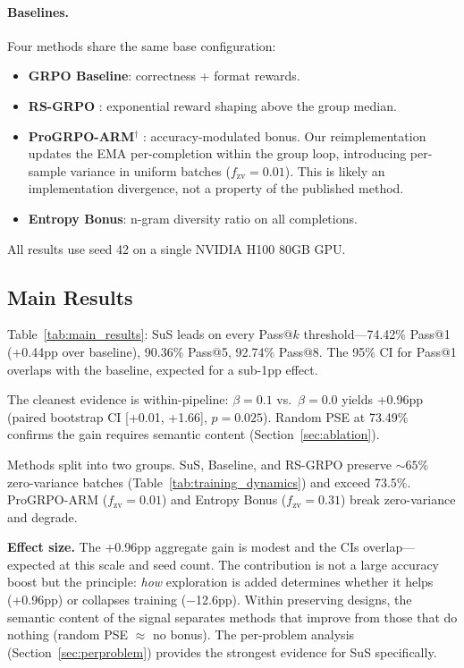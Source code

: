 \documentclass[10pt]{article}
\begin{document}
\paragraph{Baselines.}
Four methods share the same base configuration:
\begin{itemize}[leftmargin=*,noitemsep,topsep=2pt]
    \item \textbf{GRPO Baseline}: correctness + format rewards.
    \item \textbf{RS-GRPO} \citep{yu2025rsgrpo}: exponential reward shaping above the group median.
    \item \textbf{ProGRPO-ARM$^\dagger$} \citep{cui2025progrpo}: accuracy-modulated bonus. Our reimplementation updates the EMA per-completion within the group loop, introducing per-sample variance in uniform batches ($f_{\text{zv}} = 0.01$). This is likely an implementation divergence, not a property of the published method.
    \item \textbf{Entropy Bonus}: n-gram diversity ratio on all completions.
\end{itemize}

All results use seed 42 on a single NVIDIA H100 80GB GPU.

\subsection{Main Results}
\label{sec:main_results}



Table~\ref{tab:main_results}: SuS leads on every Pass@$k$ threshold---74.42\% Pass@1 (+0.44pp over baseline), 90.36\% Pass@5, 92.74\% Pass@8. The 95\% CI for Pass@1 overlaps with the baseline, expected for a sub-1pp effect.

The cleanest evidence is within-pipeline: $\beta{=}0.1$ vs.\ $\beta{=}0.0$ yields +0.96pp (paired bootstrap CI [+0.01, +1.66], $p{=}0.025$). Random PSE at 73.49\% confirms the gain requires semantic content (Section~\ref{sec:ablation}).

Methods split into two groups. SuS, Baseline, and RS-GRPO preserve ${\sim}65\%$ zero-variance batches (Table~\ref{tab:training_dynamics}) and exceed 73.5\%. ProGRPO-ARM ($f_{\text{zv}} = 0.01$) and Entropy Bonus ($f_{\text{zv}} = 0.31$) break zero-variance and degrade.

\textbf{Effect size.} The +0.96pp aggregate gain is modest and the CIs overlap---expected at this scale and seed count. The contribution is not a large accuracy boost but the principle: \emph{how} exploration is added determines whether it helps (+0.96pp) or collapses training ($-$12.6pp). Within preserving designs, the semantic content of the signal separates methods that improve from those that do nothing (random PSE $\approx$ no bonus). The per-problem analysis (Section~\ref{sec:perproblem}) provides the strongest evidence for SuS specifically.
\end{document}
